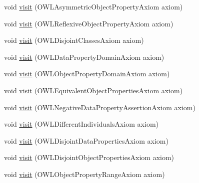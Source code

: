 \begin{DoxyCompactItemize}
void \hyperlink{classuk_1_1ac_1_1manchester_1_1cs_1_1owlapi_1_1dlsyntax_1_1_d_l_syntax_object_renderer_afcbd3c567e7f76458cec6bfcd9c245f8}{visit} (O\-W\-L\-Asymmetric\-Object\-Property\-Axiom axiom)
\item 
void \hyperlink{classuk_1_1ac_1_1manchester_1_1cs_1_1owlapi_1_1dlsyntax_1_1_d_l_syntax_object_renderer_a242f05636f14dd0e2c724ffb931f6464}{visit} (O\-W\-L\-Reflexive\-Object\-Property\-Axiom axiom)
\item 
void \hyperlink{classuk_1_1ac_1_1manchester_1_1cs_1_1owlapi_1_1dlsyntax_1_1_d_l_syntax_object_renderer_a4ca99115cf2a9cf4322bd3454391852f}{visit} (O\-W\-L\-Disjoint\-Classes\-Axiom axiom)
\item 
void \hyperlink{classuk_1_1ac_1_1manchester_1_1cs_1_1owlapi_1_1dlsyntax_1_1_d_l_syntax_object_renderer_ae3fd9e4e03d359000c6a1863dc17358c}{visit} (O\-W\-L\-Data\-Property\-Domain\-Axiom axiom)
\item 
void \hyperlink{classuk_1_1ac_1_1manchester_1_1cs_1_1owlapi_1_1dlsyntax_1_1_d_l_syntax_object_renderer_a19826d2478f3f21593b73384fd84560c}{visit} (O\-W\-L\-Object\-Property\-Domain\-Axiom axiom)
\item 
void \hyperlink{classuk_1_1ac_1_1manchester_1_1cs_1_1owlapi_1_1dlsyntax_1_1_d_l_syntax_object_renderer_a0c9c11ac37a550287edffa93773bf7a1}{visit} (O\-W\-L\-Equivalent\-Object\-Properties\-Axiom axiom)
\item 
void \hyperlink{classuk_1_1ac_1_1manchester_1_1cs_1_1owlapi_1_1dlsyntax_1_1_d_l_syntax_object_renderer_a9b17938daa2e0a7c3fb396d5e908e068}{visit} (O\-W\-L\-Negative\-Data\-Property\-Assertion\-Axiom axiom)
\item 
void \hyperlink{classuk_1_1ac_1_1manchester_1_1cs_1_1owlapi_1_1dlsyntax_1_1_d_l_syntax_object_renderer_af545ffab2c20499922852b2a38a6d7a2}{visit} (O\-W\-L\-Different\-Individuals\-Axiom axiom)
\item 
void \hyperlink{classuk_1_1ac_1_1manchester_1_1cs_1_1owlapi_1_1dlsyntax_1_1_d_l_syntax_object_renderer_a1dc7ff94f02ef19e98304f76cbdf8a97}{visit} (O\-W\-L\-Disjoint\-Data\-Properties\-Axiom axiom)
\item 
void \hyperlink{classuk_1_1ac_1_1manchester_1_1cs_1_1owlapi_1_1dlsyntax_1_1_d_l_syntax_object_renderer_a8cd95b34612461cf7a5058891672b7ac}{visit} (O\-W\-L\-Disjoint\-Object\-Properties\-Axiom axiom)
\item 
void \hyperlink{classuk_1_1ac_1_1manchester_1_1cs_1_1owlapi_1_1dlsyntax_1_1_d_l_syntax_object_renderer_a6e758a08f6f4e9d993070b4a1242583d}{visit} (O\-W\-L\-Object\-Property\-Range\-Axiom axiom)

\end{DoxyCompactItemize}
